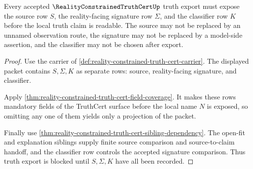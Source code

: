 \begin{theorem}
\label{thm:reality-constrained-truth-cert-source-signature-classifier-obligation}
Every accepted $\RealityConstrainedTruthCertUp$ truth export must expose the source row $S$, the reality-facing signature row $\Sigma$, and the classifier row $K$ before the local truth claim is readable. The source may not be replaced by an unnamed observation route, the signature may not be replaced by a model-side assertion, and the classifier may not be chosen after export.
\end{theorem}
\begin{proof}
Use the carrier of \autoref{def:reality-constrained-truth-cert-carrier}. The displayed packet contains $S,\Sigma,K$ as separate rows: source, reality-facing signature, and classifier.

Apply \autoref{thm:reality-constrained-truth-cert-field-coverage}. It makes these rows mandatory fields of the TruthCert surface before the local name $N$ is exposed, so omitting any one of them yields only a projection of the packet.

Finally use \autoref{thm:reality-constrained-truth-cert-sibling-dependency}. The open-fit and explanation siblings supply finite source comparison and source-to-claim handoff, and the classifier row controls the accepted signature comparison. Thus truth export is blocked until $S,\Sigma,K$ have all been recorded.
\end{proof}

